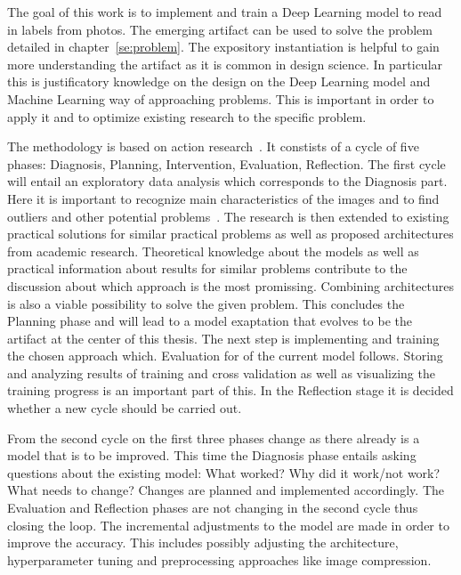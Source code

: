 The goal of this work is to implement and train a Deep Learning model to read in labels from photos.
The emerging artifact can be used to solve the problem detailed in chapter~\ref{se:problem}.
The expository instantiation is helpful to gain more understanding the artifact as it is common
in design science.
In particular this is justificatory knowledge on the design on the Deep Learning model and
Machine Learning way of approaching problems.
This is important in order to apply it and to optimize existing research to the specific problem.

The methodology is based on action research~\cite{johannesson_introduction_2021}.
It constists of a cycle of five phases: Diagnosis, Planning, Intervention, Evaluation, Reflection.
The first cycle will entail an exploratory data analysis which corresponds to the Diagnosis part.
Here it is important to recognize main characteristics of the images and to find outliers
and other potential problems~\cite{cox_translating_2017}.
The research is then extended to existing practical solutions for similar practical problems as
well as proposed architectures from academic research.
Theoretical knowledge about the models as well as practical information about results for
similar problems contribute to the discussion about which approach is the most promissing.
Combining architectures is also a viable possibility to solve the given problem.
This concludes the Planning phase and will lead to a model exaptation that evolves to be the
artifact at the center of this thesis.
The next step is implementing and training the chosen approach which.
Evaluation for of the current model follows.
Storing and analyzing results of training and cross validation as well as visualizing the training
progress is an important part of this.
In the Reflection stage it is decided whether a new cycle should be carried out.

From the second cycle on the first three phases change as there already is a model that is to be
improved.
This time the Diagnosis phase entails asking questions about the existing model: What worked?
Why did it work/not work? What needs to change?
Changes are planned and implemented accordingly.
The Evaluation and Reflection phases are not changing in the second cycle thus closing the loop.
The incremental adjustments to the model are made in order to improve the accuracy.
This includes possibly adjusting the architecture, hyperparameter tuning and preprocessing approaches
like image compression.


